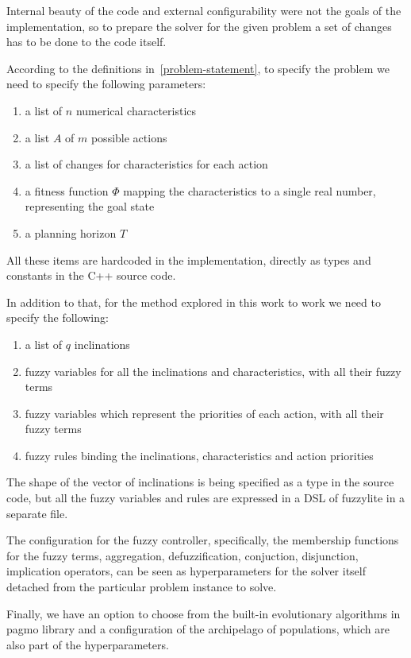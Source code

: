 \documentclass[12pt, a4paper]{article}
\begin{document}
	Internal beauty of the code and external configurability were not the goals of the implementation, so to prepare the solver for the given problem a set of changes has to be done to the code itself.
	
	According to the definitions in~\ref{problem-statement}, to specify the problem we need to specify the following parameters:
	
	\begin{enumerate}
		\item a list of $n$ numerical characteristics
		\item a list $A$ of $m$ possible actions
		\item a list of changes for characteristics for each action
		\item a fitness function $\Phi$ mapping the characteristics to a single real number, representing the goal state
		\item a planning horizon $T$
	\end{enumerate}
	
	All these items are hardcoded in the implementation, directly as types and constants in the C++ source code.
	
	In addition to that, for the method explored in this work to work we need to specify the following:
	
	\begin{enumerate}
		\item a list of $q$ inclinations
		\item fuzzy variables for all the inclinations and characteristics, with all their fuzzy terms
		\item fuzzy variables which represent the priorities of each action, with all their fuzzy terms
		\item fuzzy rules binding the inclinations, characteristics and action priorities
	\end{enumerate}

	The shape of the vector of inclinations is being specified as a type in the source code, but all the fuzzy variables and rules are expressed in a DSL of fuzzylite in a separate file.
	
	The configuration for the fuzzy controller, specifically, the membership functions for the fuzzy terms, aggregation, defuzzification, conjuction, disjunction, implication operators, can be seen as hyperparameters for the solver itself detached from the particular problem instance to solve.
	
	Finally, we have an option to choose from the built-in evolutionary algorithms in pagmo library and a configuration of the archipelago of populations, which are also part of the hyperparameters.
	
\end{document}
